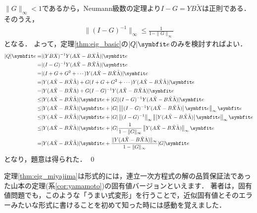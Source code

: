 \begin{Proof}
	$\| G \|_{\infty} < 1$であるから，Neumann級数の定理より$I - G = Y B \tilde{X}$は正則である．
	そのうえ，
	\begin{align*}
		\| (I - G)^{-1} \|_{\infty} \le \frac{ 1 }{1 - \| G \|_{\infty}}
	\end{align*}
	となる．
	よって，定理\ref{thm:eig_basic}の$| Q | \vector{e}$のみを検討すればよい．
	\begin{align*}
		| Q | \vector{e} =& | (Y B \tilde{X})^{-1} Y ( A \tilde{X} - B \tilde{X} \tilde{\Lambda} ) | \vector{e} \\
		=& | ( I - G )^{-1} Y ( A \tilde{X} - B \tilde{X} \tilde{\Lambda} ) | \vector{e} \\
		=& | (I + G + G^2 + \cdots ) Y ( A \tilde{X} - B \tilde{X} \tilde{\Lambda} ) | \vector{e} \\
		=& | Y ( A \tilde{X} - B \tilde{X} \tilde{\Lambda} )  +  G (I + G + G^2 + \cdots ) Y ( A \tilde{X} - B \tilde{X} \tilde{\Lambda} ) | \vector{e} \\
		=& | Y ( A \tilde{X} - B \tilde{X} \tilde{\Lambda} )  +  G ( I - G )^{-1} Y ( A \tilde{X} - B \tilde{X} \tilde{\Lambda} ) | \vector{e} \\
		\le& | Y ( A \tilde{X} - B \tilde{X} \tilde{\Lambda} ) | \vector{e} + | G | | ( I - G )^{-1} Y ( A \tilde{X} - B \tilde{X} \tilde{\Lambda} ) | \vector{e} \\
		\le& | Y ( A \tilde{X} - B \tilde{X} \tilde{\Lambda} ) | \vector{e} + | G | \left\| \left| ( I - G )^{-1} Y ( A \tilde{X} - B \tilde{X} \tilde{\Lambda} ) \right| \vector{e} \right\|_{\infty} \vector{e} \\
		\le& | Y ( A \tilde{X} - B \tilde{X} \tilde{\Lambda} ) | \vector{e} + | G | \left\| ( I - G )^{-1} \right\|_{\infty} \left\| \left| Y ( A \tilde{X} - B \tilde{X} \tilde{\Lambda} ) \right| \vector{e} \right\|_{\infty} \vector{e} \\
		\le& | Y ( A \tilde{X} - B \tilde{X} \tilde{\Lambda} ) | \vector{e} + | G | \frac{ 1 }{1 - \| G \|_{\infty}} \left\| Y ( A \tilde{X} - B \tilde{X} \tilde{\Lambda} ) \right\|_{\infty} \vector{e} \\
		=& | Y ( A \tilde{X} - B \tilde{X} \tilde{\Lambda} ) | \vector{e} + \frac{ \| Y ( A \tilde{X} - B \tilde{X} \tilde{\Lambda} ) \|_{\infty} }{1 - \| G \|_{\infty}} | G | \vector{e} 
	\end{align*}
	となり，題意は得られた．
	\qed
\end{Proof}

定理\ref{thm:eig_miyajima}は形式的には，連立一次方程式の解の品質保証法であった山本の定理(系\ref{cor:yamamoto})の固有値バージョンといえます．
著者は，固有値問題でも，このような「うまい式変形」を行うことで，近似固有値とそのエラーみたいな形式に書けることを初めて知った時には感動を覚えました．

